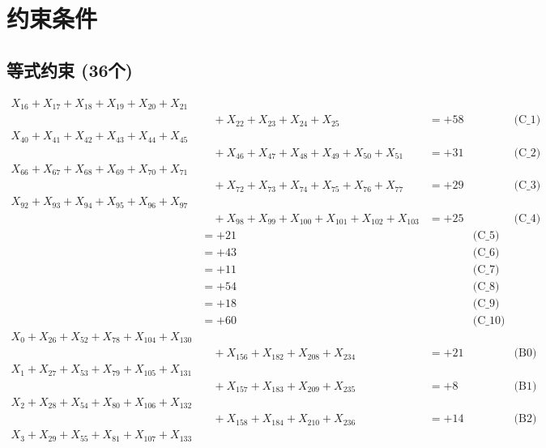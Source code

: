 \documentclass[a4paper,10pt]{article}
\begin{document}
\section{约束条件}

\subsection{等式约束 (36个)}

\allowdisplaybreaks
{\small
\begin{align}
X_{16} + X_{17} + X_{18} + X_{19} + X_{20} + X_{21} \\[0.1ex]
&\quad  + X_{22} + X_{23} + X_{24} + X_{25} &= +58 && \text{(C\_1)} \\
X_{40} + X_{41} + X_{42} + X_{43} + X_{44} + X_{45} \\[0.1ex]
&\quad  + X_{46} + X_{47} + X_{48} + X_{49} + X_{50} + X_{51} &= +31 && \text{(C\_2)} \\
X_{66} + X_{67} + X_{68} + X_{69} + X_{70} + X_{71} \\[0.1ex]
&\quad  + X_{72} + X_{73} + X_{74} + X_{75} + X_{76} + X_{77} &= +29 && \text{(C\_3)} \\
X_{92} + X_{93} + X_{94} + X_{95} + X_{96} + X_{97} \\[0.1ex]
&\quad  + X_{98} + X_{99} + X_{100} + X_{101} + X_{102} + X_{103} &= +25 && \text{(C\_4)} \\
 &= +21 && \text{(C\_5)} \\
\allowbreak
 &= +43 && \text{(C\_6)} \\
 &= +11 && \text{(C\_7)} \\
 &= +54 && \text{(C\_8)} \\
 &= +18 && \text{(C\_9)} \\
 &= +60 && \text{(C\_10)} \\
\allowbreak
X_{0} + X_{26} + X_{52} + X_{78} + X_{104} + X_{130} \\[0.1ex]
&\quad  + X_{156} + X_{182} + X_{208} + X_{234} &= +21 && \text{(B0)} \\
X_{1} + X_{27} + X_{53} + X_{79} + X_{105} + X_{131} \\[0.1ex]
&\quad  + X_{157} + X_{183} + X_{209} + X_{235} &= +8 && \text{(B1)} \\
X_{2} + X_{28} + X_{54} + X_{80} + X_{106} + X_{132} \\[0.1ex]
&\quad  + X_{158} + X_{184} + X_{210} + X_{236} &= +14 && \text{(B2)} \\
X_{3} + X_{29} + X_{55} + X_{81} + X_{107} + X_{133} \\[0.1ex]

\end{align}}
\end{document}
